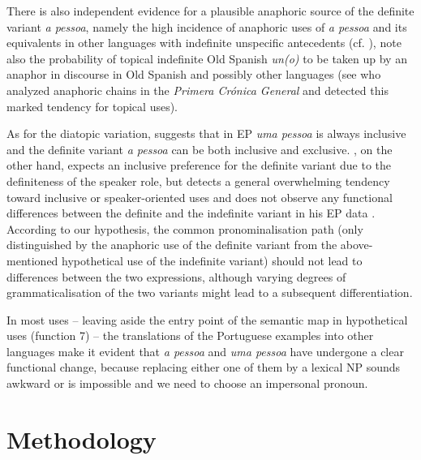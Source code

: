 \documentclass[output=paper]{langscibook}
\begin{document}
{There is also independent evidence for a plausible anaphoric source of the definite variant} {\textit{a pessoa}}{, namely the high incidence of anaphoric uses of} {\textit{a pessoa}} {and its equivalents in other languages with indefinite unspecific antecedents (cf. \citealt{AmaralMihatsch2019}), note also the probability of topical indefinite Old Spanish} {\textit{un(o)} }{to be taken up by an anaphor in discourse in Old Spanish and possibly other languages (see \citealt{Elvira1994} who analyzed anaphoric chains in the} {\textit{Primera Crónica General}} {and detected this marked tendency for topical uses).}



{As for the diatopic variation, \citet{Martins2022} suggests that in EP} {\textit{uma pessoa}} {is always inclusive and the definite variant} {\textit{a pessoa} }{can be both inclusive and exclusive. \citet{Posio2021}, on the other hand, expects an inclusive preference for the definite variant due to the definiteness of the speaker role, but detects a general overwhelming tendency toward inclusive or speaker{}-oriented uses and does not observe any functional differences between the definite and the indefinite variant in his EP data \citep[220]{Posio2017}. According to our hypothesis, the common pronominalisation path (only distinguished by the anaphoric use of the definite variant from the above{}-mentioned hypothetical use of the indefinite variant) should not lead to differences between the two expressions, although varying degrees of grammaticalisation of the two variants might lead to a subsequent differentiation.}



{In most uses – leaving aside the entry point of the semantic map in hypothetical uses (function 7) – the translations of the Portuguese examples into other languages make it evident that} {\textit{a pessoa}} {and} {\textit{uma pessoa}} have undergone a clear functional change, because replacing either one of them by a lexical NP sounds awkward or is impossible and we need to choose an impersonal pronoun.


\pagebreak
\section{Methodology}\label{sec:amaral:4}
\end{document}
